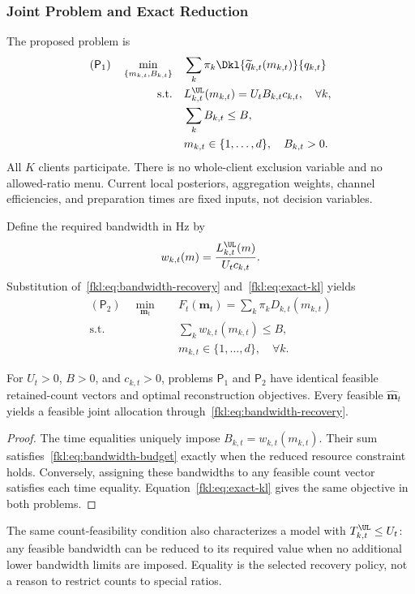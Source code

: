 \subsubsection{Joint Problem and Exact Reduction}
The proposed problem is
\begin{equation}
 \begin{aligned}
 (\mathsf P_1)\quad
 \min_{\{m_{k,t},B_{k,t}\}}\quad&
 \sum_k\pi_k\Dkl{\widetilde q_{k,t}(m_{k,t})}{q_{k,t}}\\
 \mathrm{s.t.}\quad&
 L_{k,t}^{\UL}(m_{k,t})=U_tB_{k,t}c_{k,t},\quad\forall k,\\
 &\sum_kB_{k,t}\le B,\\
 &m_{k,t}\in\{1,\ldots,d\},\quad B_{k,t}>0.
 \end{aligned}
 \label{fkl:prob:joint}
\end{equation}
All $K$ clients participate. There is no whole-client exclusion variable and no allowed-ratio menu. Current local posteriors, aggregation weights, channel efficiencies, and preparation times are fixed inputs, not decision variables.

Define the required bandwidth in Hz by
\begin{equation}
 w_{k,t}(m)=\frac{L_{k,t}^{\UL}(m)}{U_tc_{k,t}}.
 \label{fkl:eq:bandwidth-cost}
\end{equation}
Substitution of~\eqref{fkl:eq:bandwidth-recovery} and~\eqref{fkl:eq:exact-kl} yields
\begin{equation}
 \begin{aligned}
 (\mathsf P_2)\quad \min_{\mathbf m_t}\quad&
 F_t(\mathbf m_t)=\sum_k\pi_kD_{k,t}(m_{k,t})\\
 \mathrm{s.t.}\quad&\sum_kw_{k,t}(m_{k,t})\le B,\\
 &m_{k,t}\in\{1,\ldots,d\},\quad\forall k.
 \end{aligned}
 \label{fkl:prob:counts}
\end{equation}

\begin{proposition}
For $U_t>0$, $B>0$, and $c_{k,t}>0$, problems $\mathsf P_1$ and $\mathsf P_2$ have identical feasible retained-count vectors and optimal reconstruction objectives. Every feasible $\widehat{\mathbf m}_t$ yields a feasible joint allocation through~\eqref{fkl:eq:bandwidth-recovery}.
\end{proposition}
\begin{proof}
The time equalities uniquely impose $B_{k,t}=w_{k,t}(m_{k,t})$. Their sum satisfies~\eqref{fkl:eq:bandwidth-budget} exactly when the reduced resource constraint holds. Conversely, assigning these bandwidths to any feasible count vector satisfies each time equality. Equation~\eqref{fkl:eq:exact-kl} gives the same objective in both problems.
\end{proof}
The same count-feasibility condition also characterizes a model with $T_{k,t}^{\UL}\le U_t$: any feasible bandwidth can be reduced to its required value when no additional lower bandwidth limits are imposed. Equality is the selected recovery policy, not a reason to restrict counts to special ratios.

